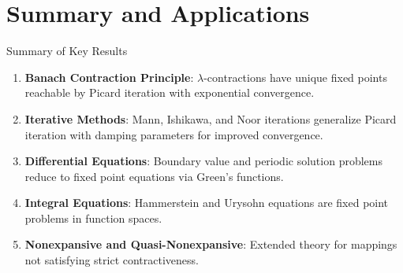 \documentclass[aspectratio=169,10pt]{beamer}
\begin{document}
\section{Summary and Applications}

\begin{frame}{Summary of Key Results}
  \begin{enumerate}
    \item \textbf{Banach Contraction Principle}: $\lambda$-contractions have unique
          fixed points reachable by Picard iteration with exponential convergence.

    \vspace{0.25cm}

    \item \textbf{Iterative Methods}: Mann, Ishikawa, and Noor iterations generalize
          Picard iteration with damping parameters for improved convergence.

    \vspace{0.25cm}

    \item \textbf{Differential Equations}: Boundary value and periodic solution problems
          reduce to fixed point equations via Green's functions.

    \vspace{0.25cm}

    \item \textbf{Integral Equations}: Hammerstein and Urysohn equations are fixed
          point problems in function spaces.

    \vspace{0.25cm}

    \item \textbf{Nonexpansive and Quasi-Nonexpansive}: Extended theory for mappings
          not satisfying strict contractiveness.
  \end{enumerate}
\end{frame}
\end{document}

